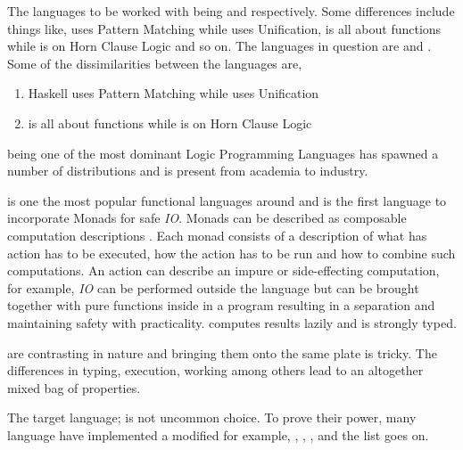 \documentclass[thesis-solanki.tex]{subfiles}
\begin{document}
The languages to be worked with being  and  respectively.
Some differences include things like,  uses Pattern Matching while  uses
Unification,  is all about functions while  is on Horn Clause Logic and so
on.
The languages in question are  and . Some of the dissimilarities between the languages are,
\begin{enumerate}
\item { Haskell} uses Pattern Matching while  uses Unification

\item {} is all about functions while  is on Horn Clause Logic
\end{enumerate} 

 \cite{wikiprolog}\yyy{}{\Large,} being one of the most dominant Logic Programming
Languages\yyy{}{\Large,} has  
spawned a number of distributions and is present from academia to industry.  

 is one the most popular \cite{website:langpop} functional languages around and is the 
first language to incorporate Monads \cite{wadler1992comprehending} for safe \textit{IO}. Monads can be 
described as composable computation descriptions \cite{website:monadshaskellorg} . Each monad consists of a 
description of what has action has to be executed, how the action has to be run and how to combine such 
computations. An action can describe an impure or side-effecting computation, for example, \textit{IO} can be 
performed outside the language but can be brought together with pure functions inside in a program resulting in a 
separation and maintaining safety with practicality.  computes results lazily and is strongly 
typed. 

 are contrasting in nature\yyy{}{\Large,} and
bringing them onto the same plate is tricky.
The differences in typing, execution, working among others lead to an altogether mixed bag of properties.

The target language;  is not  uncommon choice. To prove their power, many language have implemented \cite{swipembedd} a 
modified \yyy{}{\Large:} for example,  \cite{racklog},   
\cite{komorowski1982qlog,robinson1982loglisp,robinson1980loglisp},  \cite{wikiprolog, jlog}, 
 \cite{jscriptlog}\yyy{}{\Large,} and the list \cite{yieldprolog} goes on. 
\end{document}
